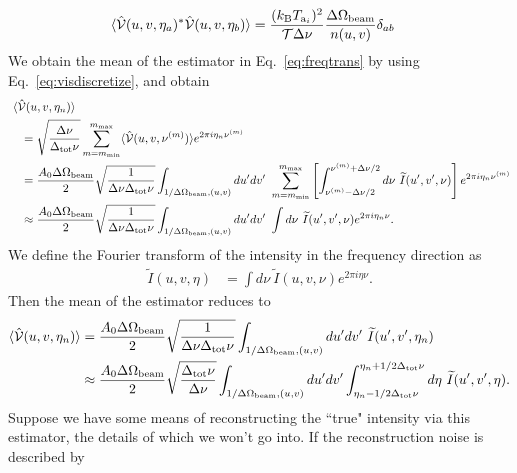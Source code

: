 \documentclass[11pt]{article}
\numberwithin{equation}{section}
\newcommand{\wt}[1]{\widetilde{#1}}
\begin{document}
\begin{align}
  \langle \hat{\cal V}(u, v, \eta_a)^\ast \hat{\cal V}(u, v, \eta_b) \rangle & = \frac{( k_{\rm B} T_{{\rm a}_i})^2}{{\cal T} \Delta \nu}  \frac{\Delta \Omega_{\rm beam}}{n(u, v)} \delta_{a b} \label{eq:freqtransvar}
\end{align}
We obtain the mean of the estimator in Eq.~\eqref{eq:freqtrans} by using Eq.~\eqref{eq:visdiscretize}, and obtain
\begin{align}
~~~ & \!\!\!\!
  \langle \hat{\cal V}(u, v, \eta_n) \rangle \notag \\
  & = \sqrt{ \frac{\Delta \nu}{\Delta_{\rm tot} \nu} } \sum_{m=m_{\rm min}}^{m_{\rm max}} \langle \hat{\cal V}(u, v, \nu^{(m)}) \rangle e^{2\pi i \eta_n \nu^{(m)}} \notag \\
  & = \frac{A_0 \Delta \Omega_{\rm beam}}{2} \sqrt{ \frac{1}{\Delta \nu \Delta_{\rm tot} \nu} } \int_{1/\Delta \Omega_{\rm beam},(u,v)} du^\prime dv^\prime \ \sum_{m=m_{\rm min}}^{m_{\rm max}} \left[ \int_{\nu^{(m)} - \Delta \nu/2}^{\nu^{(m)} + \Delta \nu/2} d\nu \ \wt{I}(u^\prime, v^\prime, \nu) \right] e^{2\pi i \eta_n \nu^{(m)}} \notag \\
  & \approx \frac{A_0 \Delta \Omega_{\rm beam}}{2} \sqrt{ \frac{1}{\Delta \nu \Delta_{\rm tot} \nu} } \int_{1/\Delta \Omega_{\rm beam},(u,v)} du^\prime dv^\prime \ \int d\nu \ \wt{I}(u^\prime, v^\prime, \nu)  e^{2\pi i \eta_n \nu} \mbox{.}
\end{align}
We define the Fourier transform of the intensity in the frequency direction as
\begin{align}
  \wt{I}(u, v, \eta) & = \int d\nu \ \wt{I}(u, v, \nu)  e^{2\pi i \eta \nu} \mbox{.}
\end{align}
Then the mean of the estimator reduces to
\begin{align}
  \langle \hat{\cal V}(u, v, \eta_n) \rangle
  & = \frac{A_0 \Delta \Omega_{\rm beam}}{2} \sqrt{ \frac{1}{\Delta \nu \Delta_{\rm tot} \nu} } \int_{1/\Delta \Omega_{\rm beam},(u,v)} du^\prime dv^\prime \ \wt{I}(u^\prime, v^\prime, \eta_n) \notag \\
  & \approx \frac{A_0 \Delta \Omega_{\rm beam}}{2} \sqrt{ \frac{\Delta_{\rm tot} \nu}{\Delta \nu}} \int_{1/\Delta \Omega_{\rm beam},(u,v)} du^\prime dv^\prime \int_{\eta_n - 1/2\Delta_{\rm tot}\nu}^{\eta_n + 1/2\Delta_{\rm tot}\nu} d\eta \ \wt{I}(u^\prime, v^\prime, \eta) \mbox{.} \label{eq:freqtransavg}
\end{align}
Suppose we have some means of reconstructing the ``true" intensity via this estimator, the details of which we won't go into. If the reconstruction noise is described by
\end{document}
